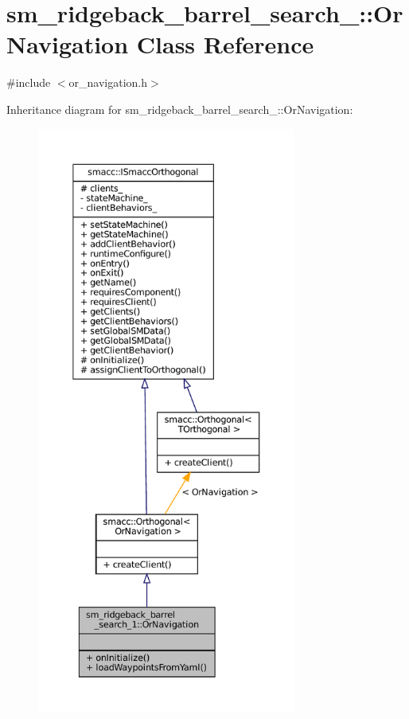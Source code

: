 \hypertarget{classsm__ridgeback__barrel__search__1_1_1OrNavigation}{}\section{sm\+\_\+ridgeback\+\_\+barrel\+\_\+search\+\_\+:\+:Or\+Navigation Class Reference}
\label{classsm__ridgeback__barrel__search__1_1_1OrNavigation}


{\ttfamily \#include $<$or\+\_\+navigation.\+h$>$}



Inheritance diagram for sm\+\_\+ridgeback\+\_\+barrel\+\_\+search\+\_\+:\+:Or\+Navigation\+:
\nopagebreak
\begin{figure}[H]
\begin{center}
\leavevmode
\includegraphics[height=550pt]{classsm__ridgeback__barrel__search__1_1_1OrNavigation__inherit__graph}
\end{center}
\end{figure}


